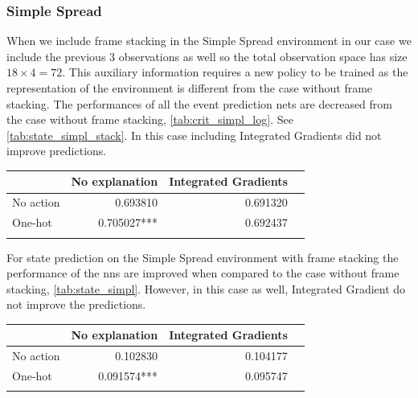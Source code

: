 \documentclass[UKenglish]{uiomasterthesis}
\begin{document}
\subsubsection{Simple Spread}
\label{sec:simpl_exp3}
When we include frame stacking in the Simple Spread environment in our case we include the previous 3 observations as well so the total observation space has size $18\times 4 = 72$. This auxiliary information requires a new policy to be trained as the representation of the environment is different from the case without frame stacking. The performances of all the event prediction nets are decreased from the case without frame stacking, \cref{tab:crit_simpl_log}. See \cref{tab:state_simpl_stack}. In this case including Integrated Gradients did not improve predictions.

\begin{center}
\label{tab:state_simpl_stack}
\begin{tabular}{lrrr}
\toprule
 & No explanation & Integrated Gradients \\
\midrule
No action & 0.693810 & 0.691320 \\
One-hot & 0.705027*** & 0.692437 \\
\bottomrule
\addlinespace[2pt]
\multicolumn{3}{l}{\textsuperscript{***}$p<0.001$, 
  \textsuperscript{**}$p<0.01$, 
  \textsuperscript{*}$p<0.05$}
\end{tabular}
\end{center}

For state prediction on the Simple Spread environment with frame stacking the performance of the \acp{nn} are improved when compared to the case without frame stacking, \ref{tab:state_simpl}. However, in this case as well, Integrated Gradient do not improve the predictions.

\begin{center}
\label{tab:event_simpl_stack}
\begin{tabular}{lrrr}
\toprule
 & No explanation & Integrated Gradients \\
\midrule
No action & 0.102830 & 0.104177 \\
One-hot & 0.091574*** & 0.095747 \\
\bottomrule
\addlinespace[2pt]
\multicolumn{3}{l}{\textsuperscript{***}$p<0.001$, 
  \textsuperscript{**}$p<0.01$, 
  \textsuperscript{*}$p<0.05$}
\end{tabular}
\end{center}
\end{document}
